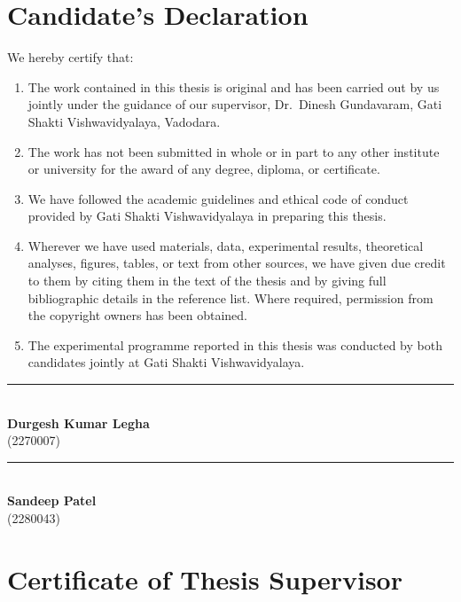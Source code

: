 \chapter*{Candidate's Declaration}

We hereby certify that:
\begin{enumerate}[label=(\roman*),leftmargin=2.2em]
  \item The work contained in this thesis is original and has been carried out by us jointly under the guidance of our supervisor, Dr.\ Dinesh Gundavaram, Gati Shakti Vishwavidyalaya, Vadodara.
  \item The work has not been submitted in whole or in part to any other institute or university for the award of any degree, diploma, or certificate.
  \item We have followed the academic guidelines and ethical code of conduct provided by Gati Shakti Vishwavidyalaya in preparing this thesis.
  \item Wherever we have used materials, data, experimental results, theoretical analyses, figures, tables, or text from other sources, we have given due credit to them by citing them in the text of the thesis and by giving full bibliographic details in the reference list. Where required, permission from the copyright owners has been obtained.
  \item The experimental programme reported in this thesis was conducted by both candidates jointly at Gati Shakti Vishwavidyalaya.
\end{enumerate}

\vspace{2.0cm}
\noindent
\begin{minipage}[t]{0.48\textwidth}
\centering
\rule{6cm}{0.4pt}\\[2pt]
\textbf{Durgesh Kumar Legha}\\(2270007)
\end{minipage}\hfill
\begin{minipage}[t]{0.48\textwidth}
\centering
\rule{6cm}{0.4pt}\\[2pt]
\textbf{Sandeep Patel}\\(2280043)
\end{minipage}

\chapter*{Certificate of Thesis Supervisor}

